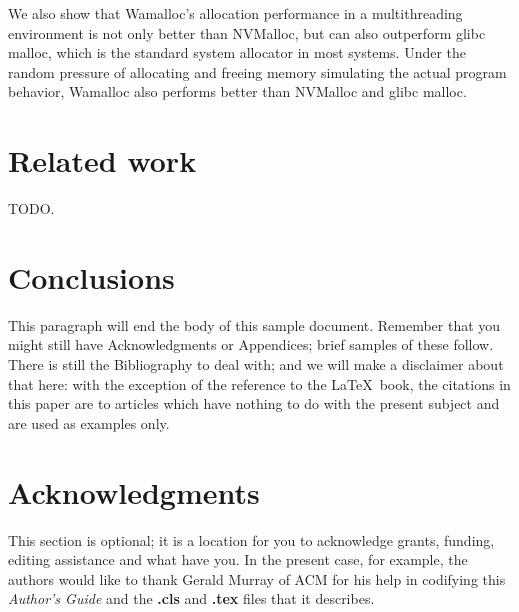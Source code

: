\documentclass{vldb}
\begin{document}
We also show that Wamalloc's allocation performance in a multithreading environment is not only better than NVMalloc,
but can also outperform glibc malloc, which is the standard system allocator in most systems.
Under the random pressure of allocating and freeing memory simulating the actual program behavior,
Wamalloc also performs better than NVMalloc and glibc malloc.

\section{Related work}

TODO.

\section{Conclusions}
This paragraph will end the body of this sample document.
Remember that you might still have Acknowledgments or
Appendices; brief samples of these
follow.  There is still the Bibliography to deal with; and
we will make a disclaimer about that here: with the exception
of the reference to the \LaTeX\ book, the citations in
this paper are to articles which have nothing to
do with the present subject and are used as
examples only.

\balance

\section{Acknowledgments}
This section is optional; it is a location for you
to acknowledge grants, funding, editing assistance and
what have you.  In the present case, for example, the
authors would like to thank Gerald Murray of ACM for
his help in codifying this \textit{Author's Guide}
and the \textbf{.cls} and \textbf{.tex} files that it describes.




\end{document}
